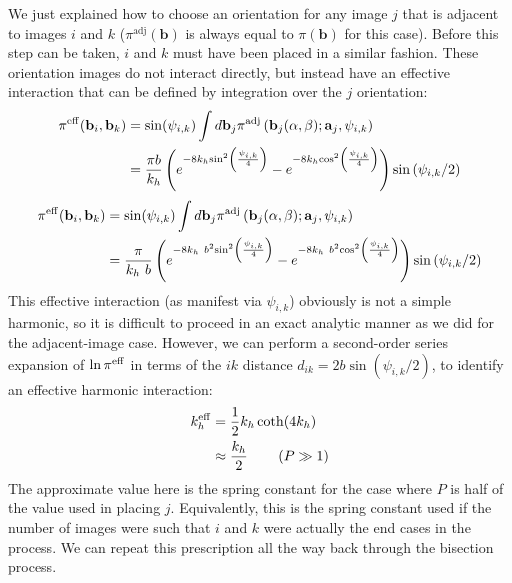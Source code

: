                     We just explained how to choose an orientation for any image $j$ that is adjacent to images $i$ and $k$ ($\pi^\text{adj} ({\mathbf b})$ is always equal to $\pi ({\mathbf b})$ for this case). Before this step can be taken, $i$ and $k$ must have been placed in a similar fashion. These orientation images do not interact directly, but instead have an effective interaction that can be defined by integration over the $j$ orientation:
\ifkhExplicitP
\begin{equation}
\begin{aligned}
\label{eq:piEff}
    \pi^{\rm eff}({\mathbf b}_i,{\mathbf b}_k)&= \sin(\psi_{i,k})\int d{\mathbf b}_j \pi^\text{adj} \left( {\mathbf b}_j(\alpha, \beta); \mathbf{a}_j, \psi_{i,k} \right) \nonumber \\
&=\frac{\pi b}{k_h}\left( {{e^{ - 8{k_h}{{\sin }^2}\left( {\frac{\psi_{i,k} }{4}} \right)}} - {e^{ - 8{k_h}{{\cos }^2}\left( {\frac{\psi_{i,k} }{4}} \right)}}} \right){{\sin \left( {\psi_{i,k} /2} \right)}}
\end{aligned}
\end{equation}
\else
\begin{equation}
\begin{aligned}
\label{eq:piEff}
\pi^{\rm eff}({\mathbf b}_i,{\mathbf b}_k)&= \sin(\psi_{i,k})\int d{\mathbf b}_j \pi^\text{adj} \left( {\mathbf b}_j(\alpha, \beta); \mathbf{a}_j, \psi_{i,k} \right) \nonumber \\
&=\frac{\pi}{k_h~b}\left( {{e^{ - 8{k_h~b^2}{{\sin }^2}\left( {\frac{\psi_{i,k} }{4}} \right)}} - {e^{ - 8{k_h~b^2}{{\cos }^2}\left( {\frac{\psi_{i,k} }{4}} \right)}}} \right){{\sin \left( {\psi_{i,k} /2} \right)}}
\end{aligned}
\end{equation}
\fi
This effective interaction (as manifest via $\psi_{i,k}$) obviously is not a simple harmonic, so  it is difficult to proceed in an exact analytic manner as we did for the adjacent-image case. However, we can perform a second-order series expansion of $\ln \pi^{\rm eff}$ in terms of the $ik$ distance $d_{ik} = 2b\sin(\psi_{i,k}/2)$, to identify an effective harmonic interaction:
\begin{align}
k_h^{\rm eff} &= \frac{1}{2}k_h\coth(4 k_h)\\
&\approx \frac{k_h}{2}    {\hspace{0.3in}} (P \gg 1)\nonumber
\end{align}
The approximate value here is the spring constant for the case where $P$ is half of the value used in placing $j$. Equivalently, this is the spring constant used if the number of images were such that $i$ and $k$ were actually the end cases in the process. We can repeat this prescription all the way back through the bisection process.

